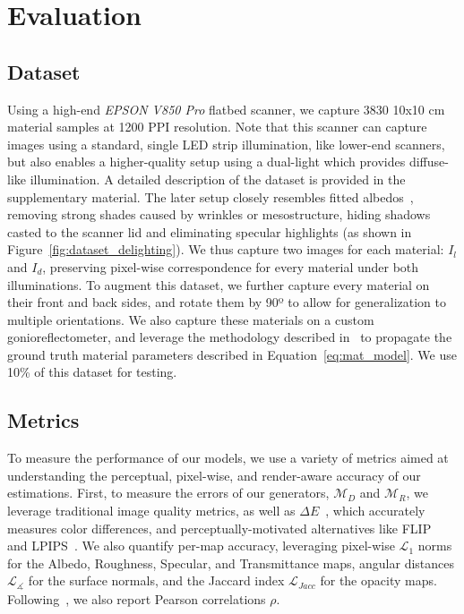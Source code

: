 \section{Evaluation}


\subsection{\textbf{Dataset}}
Using a high-end \emph{EPSON V850 Pro} flatbed scanner, we capture 3830 10x10 cm material samples at 1200 PPI resolution. %
Note that this scanner can capture images using a standard, single LED strip illumination, like lower-end scanners, but also enables a higher-quality setup using a dual-light which provides diffuse-like illumination. A detailed description of the dataset is provided in the supplementary material.
The later setup closely resembles fitted albedos~\cite{rodriguezpardo2023UMat}, removing strong shades caused by wrinkles or mesostructure, hiding shadows casted to the scanner lid and eliminating specular highlights (as shown in Figure~\ref{fig:dataset_delighting}).
We thus capture two images for each material: $I_{l}$ and $I_{d}$, preserving pixel-wise correspondence for every material under both illuminations. To augment this dataset, we further capture every material on their front and back sides, and rotate them by 90º to allow for generalization to multiple orientations. We also capture these materials on a custom gonioreflectometer, and leverage the methodology described in~\cite{rodriguezpardo2021transfer, garces2023towards} to propagate the ground truth material parameters described in Equation~\ref{eq:mat_model}. 
We use 10\% of this dataset for testing. 




\subsection{\textbf{Metrics}}
To measure the performance of our models, we use a variety of metrics aimed at understanding the perceptual, pixel-wise, and render-aware accuracy of our estimations.
First, to measure the errors of our generators, $\mathcal{M}_D$ and  $\mathcal{M}_R$, we leverage traditional image quality metrics, as well as $\Delta E$~\cite{mokrzycki2011colour}, which accurately measures color differences, and perceptually-motivated alternatives like FLIP~\cite{Andersson2020} and LPIPS~\cite{zhang2018unreasonable}. We also quantify per-map accuracy, leveraging pixel-wise $\mathcal{L}_1$ norms for the Albedo, Roughness, Specular, and Transmittance maps, angular distances $\mathcal{L}_\measuredangle$ for the surface normals, and the Jaccard index $\mathcal{L}_{Jacc}$ for the opacity maps. Following~\cite{rodriguezpardo2023UMat}, we also report Pearson correlations $\rho$.

